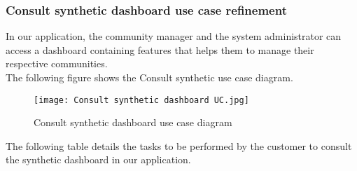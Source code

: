 \subsubsection{Consult synthetic dashboard use case refinement}
In our application, the community manager and the system administrator can access a dashboard containing features that helps them to manage their respective communities.\\
The following figure shows the Consult synthetic use case diagram.
\begin{figure}[H]%
    \center   
    \texttt{[image: Consult synthetic dashboard UC.jpg]}
    \caption{Consult synthetic dashboard use case diagram}
\end{figure}

The following table details the tasks to be performed by the customer to consult the synthetic dashboard
in our application.
